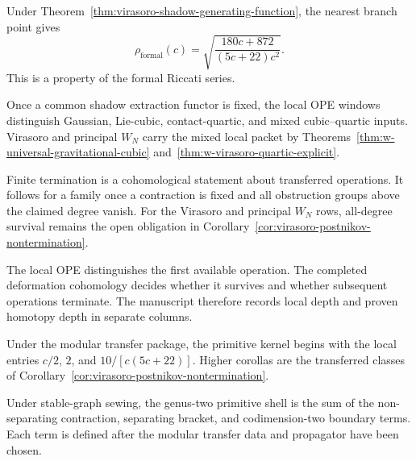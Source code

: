 \begin{remark}
\label{rem:virasoro-shadow-growth-rate}
Under Theorem~\ref{thm:virasoro-shadow-generating-function}, the
nearest branch point gives
\[
\rho_{\mathrm{formal}}(c)
=\sqrt{\frac{180c+872}{(5c+22)c^2}}.
\]
This is a property of the formal Riccati series.
\end{remark}

\begin{theorem}
\label{thm:w-archetype-trichotomy}
Once a common shadow extraction functor is fixed, the local OPE
windows distinguish Gaussian, Lie-cubic, contact-quartic, and mixed
cubic--quartic inputs.  Virasoro and principal $W_N$ carry the mixed
local packet by
Theorems~\ref{thm:w-universal-gravitational-cubic}
and~\ref{thm:w-virasoro-quartic-explicit}.
\end{theorem}

\begin{theorem}
\label{thm:w-finite-termination}
Finite termination is a cohomological statement about transferred
operations.  It follows for a family once a contraction is fixed and
all obstruction groups above the claimed degree vanish.  For the
Virasoro and principal $W_N$ rows, all-degree survival remains the
open obligation in
Corollary~\ref{cor:virasoro-postnikov-nontermination}.
\end{theorem}

\begin{remark}
\label{rem:w-postnikov-interpretation}
The local OPE distinguishes the first available operation.  The
completed deformation cohomology decides whether it survives and
whether subsequent operations terminate.  The manuscript therefore
records local depth and proven homotopy depth in separate columns.
\end{remark}

\begin{proposition}
\label{prop:virasoro-primitive-kernel}
Under the modular transfer package, the primitive kernel begins with
the local entries $c/2$, $2$, and $10/[c(5c+22)]$.  Higher corollas
are the transferred classes of
Corollary~\ref{cor:virasoro-postnikov-nontermination}.
\end{proposition}

\begin{proposition}
\label{prop:virasoro-primitive-shell}
Under stable-graph sewing, the genus-two primitive shell is the sum
of the non-separating contraction, separating bracket, and
codimension-two boundary terms.  Each term is defined after the
modular transfer data and propagator have been chosen.
\end{proposition}

